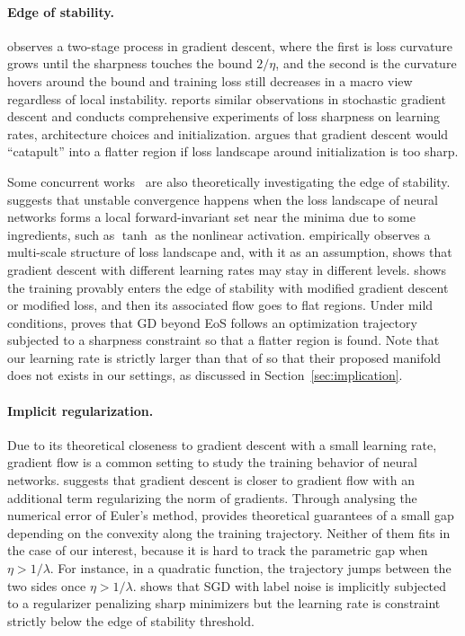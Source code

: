 \documentclass{article}
\newcommand{\citet}[1]{\cite{#1}}
\newcommand{\citep}[1]{\cite{#1}}
\theoremstyle{plain}
\theoremstyle{remark}
\begin{document}
\paragraph{Edge of stability.} \citet{cohen2020gradient} observes a two-stage process in gradient descent, where the first is loss curvature grows until the sharpness touches the bound $2/\eta$, and the second is the curvature hovers around the bound and training loss still decreases in a macro view regardless of local instability. \citet{gilmer2021loss} reports similar observations in stochastic gradient descent and conducts comprehensive experiments of loss sharpness on learning rates, architecture choices and initialization. \citet{lewkowycz2020large} argues that gradient descent would ``catapult'' into a flatter region if loss landscape around initialization is too sharp.

Some concurrent works~\citep{ahn2022understanding, ma2022multiscale, arora2022understanding, damian2022self} are also theoretically investigating the edge of stability. 
\citet{ahn2022understanding} suggests that unstable convergence happens when the loss landscape of neural networks forms a local forward-invariant set near the minima due to some ingredients, such as $\tanh$ as the nonlinear activation.
\citet{ma2022multiscale} empirically observes a multi-scale structure of loss landscape and, with it as an assumption, shows that gradient descent with different learning rates may stay in different levels.
\citet{arora2022understanding} shows the training provably enters the edge of stability with modified gradient descent or modified loss, and then its associated flow goes to flat regions. Under mild conditions, \citet{damian2022self} proves that GD beyond EoS follows an optimization trajectory subjected to a sharpness constraint so that a flatter region is found.
Note that our learning rate is strictly larger than that of \citet{damian2022self} so that their proposed manifold does not exists in our settings, as discussed in Section~\ref{sec:implication}.

\paragraph{Implicit regularization.} Due to its theoretical closeness to gradient descent with a small learning rate, gradient flow is a common setting to study the training behavior of neural networks. \citet{barrett2020implicit} suggests that gradient descent is closer to gradient flow with an additional term regularizing the norm of gradients. Through analysing the numerical error of Euler's method, \citet{elkabetz2021continuous} provides theoretical guarantees of a small gap depending on the convexity along the training trajectory. Neither of them fits in the case of our interest, because it is hard to track the parametric gap when $\eta>1/\lambda$. For instance, in a quadratic function, the trajectory jumps between the two sides once $\eta>1/\lambda$. \citet{damian2021label} shows that SGD with label noise is implicitly subjected to a regularizer penalizing sharp minimizers but the learning rate is constraint strictly below the edge of stability threshold. 
\end{document}
